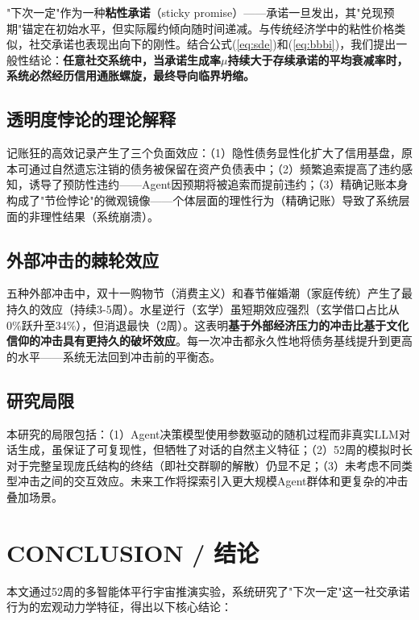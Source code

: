 \documentclass[journal]{IEEEtran}
\newcommand{\citet}[1]{\cite{#1}}
\begin{document}
"下次一定"作为一种\textbf{粘性承诺}（sticky promise）——承诺一旦发出，其"兑现预期"锚定在初始水平，但实际履约倾向随时间递减。与传统经济学中的粘性价格类似，社交承诺也表现出向下的刚性。结合公式(\ref{eq:sde})和(\ref{eq:bbbi})，我们提出一般性结论：\textbf{任意社交系统中，当承诺生成率$\mu$持续大于存续承诺的平均衰减率时，系统必然经历信用通胀螺旋，最终导向临界坍缩。}

\subsection{透明度悖论的理论解释}

记账狂的高效记录产生了三个负面效应：（1）隐性债务显性化扩大了信用基盘，原本可通过自然遗忘注销的债务被保留在资产负债表中；（2）频繁追索提高了违约感知，诱导了预防性违约——Agent因预期将被追索而提前违约；（3）精确记账本身构成了"节俭悖论"\citet{keynes_thrift}的微观镜像——个体层面的理性行为（精确记账）导致了系统层面的非理性结果（系统崩溃）。

\subsection{外部冲击的棘轮效应}

五种外部冲击中，双十一购物节（消费主义）和春节催婚潮（家庭传统）产生了最持久的效应（持续3-5周）。水星逆行（玄学）虽短期效应强烈（玄学借口占比从0\%跃升至34\%），但消退最快（2周）。这表明\textbf{基于外部经济压力的冲击比基于文化信仰的冲击具有更持久的破坏效应}。每一次冲击都永久性地将债务基线提升到更高的水平——系统无法回到冲击前的平衡态。

\subsection{研究局限}

本研究的局限包括：（1）Agent决策模型使用参数驱动的随机过程而非真实LLM对话生成，虽保证了可复现性，但牺牲了对话的自然主义特征；（2）52周的模拟时长对于完整呈现庞氏结构的终结（即社交群聊的解散）仍显不足；（3）未考虑不同类型冲击之间的交互效应。未来工作将探索引入更大规模Agent群体和更复杂的冲击叠加场景。

\section{CONCLUSION / 结论}

本文通过52周的多智能体平行宇宙推演实验，系统研究了"下次一定"这一社交承诺行为的宏观动力学特征，得出以下核心结论：
\end{document}

